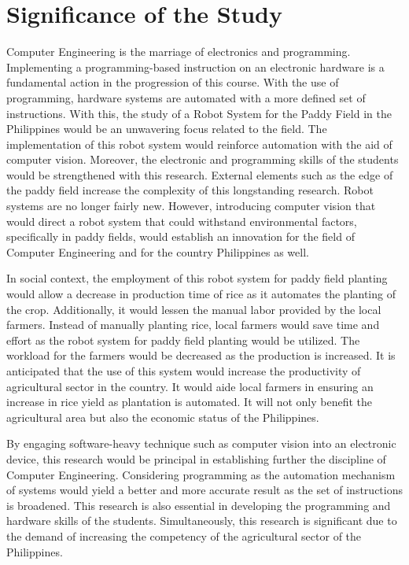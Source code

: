 \section{Significance of the Study}
 
Computer Engineering is the marriage of electronics and programming. Implementing a programming-based instruction on an electronic hardware is a fundamental action in the progression of this course. With the use of programming, hardware systems are automated with a more defined set of instructions. With this, the study of a Robot System for the Paddy Field in the Philippines would be an unwavering focus related to the field. The implementation of this robot system would reinforce automation with the aid of computer vision. Moreover, the electronic and programming skills of the students would be strengthened with this research. External elements such as the edge of the paddy field increase the complexity of this longstanding research. Robot systems are no longer fairly new. However, introducing computer vision that would direct a robot system that could withstand environmental factors, specifically in paddy fields, would establish an innovation for the field of Computer Engineering and for the country Philippines as well.
 
In social context, the employment of this robot system for paddy field planting would allow a decrease in production time of rice as it automates the planting of the crop. Additionally, it would lessen the manual labor provided by the local farmers. Instead of manually planting rice, local farmers would save time and effort as the robot system for paddy field planting would be utilized. The workload for the farmers would be decreased as the production is increased. It is anticipated that the use of this system would increase the productivity of agricultural sector in the country. It would aide local farmers in ensuring an increase in rice yield as plantation is automated. It will not only benefit the agricultural area but also the economic status of the Philippines.
 
By engaging software-heavy technique such as computer vision into an electronic device, this research would be principal in establishing further the discipline of Computer Engineering. Considering programming as the automation mechanism of systems would yield a better and more accurate result as the set of instructions is broadened. This research is also essential in developing the programming and hardware skills of the students. Simultaneously, this research is significant due to the demand of increasing the competency of the agricultural sector of the Philippines.





